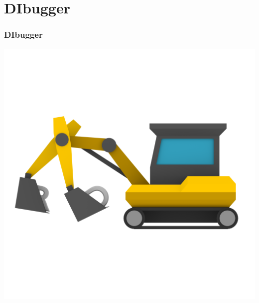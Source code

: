 \documentclass{beamer}
\begin{document}
\section{DIbugger}
\begin{frame}
\frametitle{DIbugger}
\begin{center}
\includegraphics[scale=0.2]{../DIbugger/res/ui/logo_nongi.png}
\end{center}
\end{frame}
\end{document}
